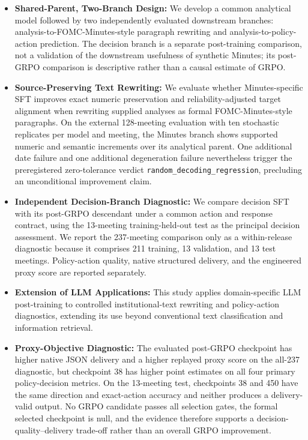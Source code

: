 \begin{itemize}
\item[] \textbf{Shared-Parent, Two-Branch Design:} We develop a common
analytical model followed by two independently evaluated downstream branches:
analysis-to-FOMC-Minutes-style paragraph rewriting and analysis-to-policy-action
prediction. The decision branch is a separate post-training comparison, not a
validation of the downstream usefulness of synthetic Minutes; its
post-GRPO comparison is descriptive rather than a causal estimate of GRPO.

\item[] \textbf{Source-Preserving Text Rewriting:} We evaluate whether
Minutes-specific SFT improves exact numeric preservation and
reliability-adjusted target alignment when rewriting supplied analyses as
formal FOMC-Minutes-style paragraphs. On the external 128-meeting evaluation
with ten stochastic replicates per model and meeting, the Minutes branch shows
supported numeric and semantic increments over its analytical parent. One
additional date failure and one additional degeneration failure nevertheless
trigger the preregistered zero-tolerance verdict
\texttt{random\_decoding\_regression}, precluding an unconditional improvement
claim.

\item[] \textbf{Independent Decision-Branch Diagnostic:} We compare decision
SFT with its post-GRPO descendant under a common action and response contract,
using the 13-meeting training-held-out test as the principal decision
assessment. We report the 237-meeting comparison only as a within-release
diagnostic because it comprises 211 training, 13 validation, and 13 test
meetings. Policy-action quality, native structured delivery, and the engineered
proxy score are reported separately.


\item[] \textbf{Extension of LLM Applications:} This study applies
domain-specific LLM post-training to controlled institutional-text rewriting
and policy-action diagnostics, extending its use beyond conventional text
classification and information retrieval.

\item[] \textbf{Proxy-Objective Diagnostic:} The evaluated post-GRPO
checkpoint has higher native JSON delivery and a higher replayed proxy score on
the all-237 diagnostic, but checkpoint 38 has higher point estimates on all
four primary policy-decision metrics. On the 13-meeting test, checkpoints 38
and 450 have the same direction and exact-action accuracy and neither produces
a delivery-valid output. No GRPO candidate passes all selection gates, the
formal selected checkpoint is null, and the evidence therefore supports a
decision-quality--delivery trade-off rather than an overall GRPO improvement.


\end{itemize}
